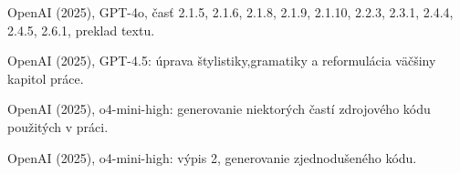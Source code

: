 \begin{trivlist}
\item OpenAI (2025), GPT-4o, časť 2.1.5, 2.1.6, 2.1.8, 2.1.9, 2.1.10, 2.2.3, 2.3.1, 2.4.4, 2.4.5, 2.6.1, preklad textu.

\item OpenAI (2025), GPT-4.5: úprava štylistiky,gramatiky a reformulácia väčšiny kapitol práce.

\item OpenAI (2025), o4-mini-high: generovanie niektorých častí zdrojového kódu použitých v práci.

\item OpenAI (2025), o4-mini-high: výpis 2, generovanie zjednodušeného kódu.

\end{trivlist}
